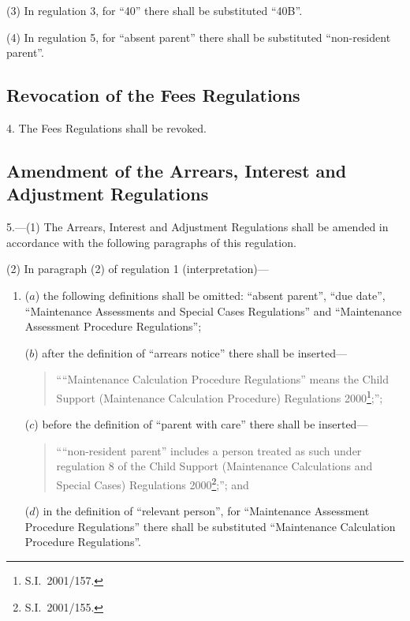 \documentclass[12pt,a4paper]{article}
\begin{document}
(3) In regulation 3, for “40” there shall be substituted “40B”.

(4) In regulation 5, for “absent parent” there shall be substituted “non-resident parent”.

\subsection[4. Revocation of the Fees Regulations]{Revocation of the Fees Regulations}

4.  The Fees Regulations shall be revoked.

\subsection[5. Amendment of the Arrears, Interest and Adjustment Regulations]{Amendment of the Arrears, Interest and Adjustment Regulations}

5.---(1)  The Arrears, Interest and Adjustment Regulations shall be amended in accordance with the following paragraphs of this regulation.

(2) In paragraph (2) of regulation 1 (interpretation)—
\begin{enumerate}\item[]
($a$) the following definitions shall be omitted: “absent parent”, “due date”, “Maintenance Assessments and Special Cases Regulations” and “Maintenance Assessment Procedure Regulations”;

($b$) after the definition of “arrears notice” there shall be inserted—
\begin{quotation}
““Maintenance Calculation Procedure Regulations” means the Child Support (Maintenance Calculation Procedure) Regulations 2000\footnote{S.I.\ 2001/157.};”;
\end{quotation}

($c$) before the definition of “parent with care” there shall be inserted—
\begin{quotation}
    ““non-resident parent” includes a person treated as such under regulation 8 of the Child Support (Maintenance Calculations and Special Cases) Regulations 2000\footnote{S.I.\ 2001/155.};”; and 
\end{quotation}

($d$) in the definition of “relevant person”, for “Maintenance Assessment Procedure Regulations” there shall be substituted “Maintenance Calculation Procedure Regulations”.
\end{enumerate}
\end{document}
